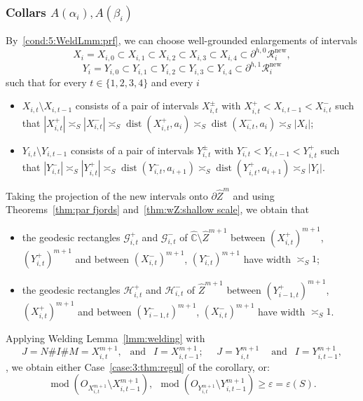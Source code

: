 \documentclass{amsart}
\renewcommand{\sp}{{\ \ }}
\newcommand{\1}{{\mathbb 1 }}
\newcommand{\FamG}{{\mathcal G}}
\newcommand{\FamH}{{\mathcal H}}
\newcommand\RR{\mathcal{R}}
\newcommand{\wZ}{{\widehat Z}}
\newcommand\new{{\operatorname{new}}}
\newcommand{\wC}{\widehat{\mathbb{C}}}
\theoremstyle{remark}
\numberwithin{equation}{section}
\theoremstyle{definition}
\newcommand{\dist}{\operatorname{dist}}
\renewcommand{\mod}{\operatorname{mod}}
\begin{document}
\subsubsection{Collars $A(\alpha_i), A(\beta_i)$} \label{sss:WL:collars}By~\ref{cond:5:WeldLmm:prf}, we can choose well-grounded enlargements of intervals \[X_i=X_{i,0}\subset X_{i,1}\subset X_{i,2}\subset X_{i,3}\subset X_{i,4}\subset \partial^{h,0}\RR^\new_i,\]\[ Y_i=Y_{i,0}\subset Y_{i,1}\subset Y_{i,2}\subset Y_{i,3}\subset Y_{i,4}\subset \partial^{h,1}\RR^\new_i\]
such that for every $t\in \{1,2,3,4\}$ and every $i$
\begin{itemize}
\item $X_{i,t}\setminus X_{i,t-1}$ consists of a pair of intervals $X_{i,t}^{\pm}$ with $X^+_{i,t}<X_{i,t-1}<X^-_{i,t}$ such that $|X^+_{i,t}|\asymp_S |X^-_{i,t}|\asymp_S \dist(X^+_{i,t}, a_i)\asymp_S \dist(X^-_{i,t}, a_i)\asymp_S |X_i| $;
\item $Y_{i,t}\setminus Y_{i,t-1}$ consists of a pair of intervals $Y_{i,t}^\pm$ with $Y^-_{i,t}<Y_{i,t-1}<Y^+_{i,t}$ such that $|Y^-_{i,t}|\asymp_S |Y^+_{i,t}|\asymp_S \dist(Y^-_{i,t}, a_{i+1})\asymp_S \dist(Y^+_{i,t}, a_{i+1})\asymp_S |Y_i|$.
\end{itemize}
Taking the projection of the new intervals onto $\partial \wZ^m$ and using Theorems~\ref{thm:par fjords} and~\ref{thm:wZ:shallow scale}, we obtain that
\begin{itemize}
\item the geodesic rectangles $\FamG^+_{i,t}$ and $\FamG^-_{i,t}$ of $\wC\setminus \wZ^{m+1}$ between $(X^+_{i,t})^{m+1}$, $(Y^+_{i,t})^{m+1}$ and between $(X^-_{i,t})^{m+1}$, $(Y^-_{i,t})^{m+1}$ have width $\asymp_S 1$;
\item the geodesic rectangles $\FamH^+_{i,t}$ and $\FamH^-_{i,t}$ of $\wZ^{m+1}$ between $(Y^+_{i-1,t})^{m+1}$, $(X^+_{i,t})^{m+1}$ and between $(Y^-_{i-1,t})^{m+1}$, $(X^-_{i,t})^{m+1}$ have width $\asymp_S 1$.
\end{itemize}


Applying Welding Lemma~\ref{lmm:welding} with
\[J=N\#I\#M =X^{m+1}_{i,t}, \sp\text{ and }\sp  I=X_{i,t-1}^{m+1}; \sp\sp  \sp J=Y^{m+1}_{i,t}\sp\sp\text{ and }\sp  I=Y_{i,t-1}^{m+1}, \]
, we obtain either Case~\eqref{case:3:thm:regul} of the corollary, or:
\begin{equation}
\label{eq:mod O:bounds}
\mod(O_{X^{m+1}_{i,t}}\setminus X_{i,t-1}^{m+1}),\sp \mod(O_{Y^{m+1}_{i,t}}\setminus Y_{i,t-1}^{m+1}) \ge \varepsilon= \varepsilon(S).
\end{equation}
\end{document}
